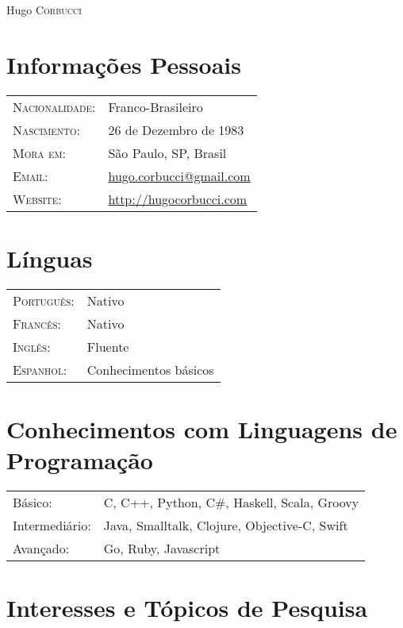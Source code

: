 \documentclass[letter,10pt]{article}
\begin{document}
\par{\centering
		{\Huge Hugo \textsc{Corbucci}
	}\bigskip\par}

\section{Informações Pessoais}

\begin{tabular}{p{2.5cm}l}
  \textsc{Nacionalidade:} & Franco-Brasileiro
  \\
  \textsc{Nascimento:} & 26 de Dezembro de 1983\\
  \textsc{Mora em:}   & São Paulo, SP, Brasil \\
  \textsc{Email:}     &
  \href{mailto:hugo.corbucci@gmail.com}{hugo.corbucci@gmail.com}\\
  \textsc{Website:} & \href{http://hugocorbucci.com}{http://hugocorbucci.com}
\end{tabular}

\section{Línguas}
\begin{tabular}{p{2.5cm}l}
 \textsc{Português:}&Nativo\\
 \textsc{Francês:}&Nativo\\
 \textsc{Inglês:}&Fluente\\
 \textsc{Espanhol:}&Conhecimentos básicos\\
\end{tabular}

\section{Conhecimentos com Linguagens de Programação}
\begin{tabular}{p{2.5cm}l}
 Básico:& C, C++, Python, C\#, Haskell, Scala, Groovy\\
 Intermediário:& Java, Smalltalk, Clojure, Objective-C, Swift\\
 Avançado:& Go, Ruby, Javascript\\
\end{tabular}

\section{Interesses e Tópicos de Pesquisa}
\end{document}
